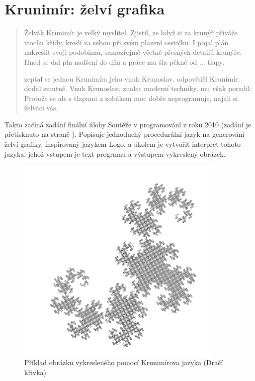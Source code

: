 \chapter{Krunimír: želví grafika}

\begin{quotation}
Želvák Krunimír je velký myslitel. Zjistil, ze když si za krunýř přiváže trochu
křídy, kreslí za sebou při svém plazení cestičku. I pojal plán nakreslit svoji
podobiznu, samozřejmě včetně přesných detailů krunýře. Hned se dal pln nadšení
do díla a práce mu šla pěkně od ... tlapy.

 zeptal se jednou Krunimíra jeho vnuk Krunoslav.
 odpověděl Krunimír.  dodal smutně.   Vnuk Krunoslav, znalec moderní techniky, mu
však poradil: 
Protože se ale s tlapami a zobákem moc dobře neprogramuje, najali si želváci
vás.
\end{quotation}

Takto začíná zadání finální úlohy Soutěže v programování z roku
2010 \cite{krunimir-task} (zadání je přetisknuto na straně
\pageref{pdf:krunimir}). Popisuje jednoduchý procedurální jazyk na generování
želví grafiky, inspirovaný jazykem Logo, a úkolem je vytvořit interpret tohoto
jazyka, jehož vstupem je text programu a výstupem vykreslený obrázek. 

\begin{figure}
  \includegraphics[width=0.9\textwidth]{krunimir/examples/dragon}
  \caption{Příklad obrázku vykresleného pomocí Krunimírova jazyka (Dračí křivka)}
  \label{fig:krunimir-dragon}
\end{figure}

